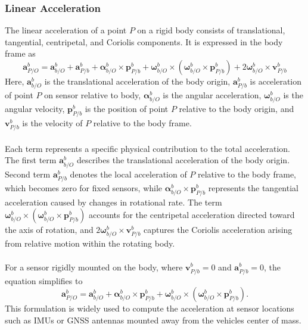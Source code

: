 \subsubsection{Linear Acceleration}
The linear acceleration of a point $P$ on a rigid body consists of translational, tangential, centripetal, and Coriolis components. It is expressed in the body frame as
$$
    \mathbf{a}_{P/O}^{b} =
    \mathbf{a}_{b/O}^{b}
    + \mathbf{a}_{P/b}^{b}
    + \boldsymbol{\alpha}_{b/O}^{b} \times \mathbf{p}_{P/b}^{b}
    + \boldsymbol{\omega}_{b/O}^{b} \times (\boldsymbol{\omega}_{b/O}^{b} \times \mathbf{p}_{P/b}^{b})
    + 2\boldsymbol{\omega}_{b/O}^{b} \times \mathbf{v}_{P/b}^{b}
$$
Here, $\mathbf{a}_{b/O}^{b}$ is the translational acceleration of the body origin, $\mathbf{a}_{P/b}^{b}$ is acceleration of point $P$ on sensor relative to body, $\boldsymbol{\alpha}_{b/O}^{b}$ is the angular acceleration, $\boldsymbol{\omega}_{b/O}^{b}$ is the angular velocity, $\mathbf{p}_{P/b}^{b}$ is the position of point $P$ relative to the body origin, and $\mathbf{v}_{P/b}^{b}$ is the velocity of $P$ relative to the body frame.  
\\ \\
Each term represents a specific physical contribution to the total acceleration. The first term $\mathbf{a}_{b/O}^{b}$ describes the translational acceleration of the body origin. Second term $\mathbf{a}_{P/b}^{b}$ denotes the local acceleration of $P$ relative to the body frame, which becomes zero for fixed sensors, while $\boldsymbol{\alpha}_{b/O}^{b} \times \mathbf{p}_{P/b}^{b}$ represents the tangential acceleration caused by changes in rotational rate. The term $\boldsymbol{\omega}_{b/O}^{b} \times (\boldsymbol{\omega}_{b/O}^{b} \times \mathbf{p}_{P/b}^{b})$ accounts for the centripetal acceleration directed toward the axis of rotation, and $2\boldsymbol{\omega}_{b/O}^{b} \times \mathbf{v}_{P/b}^{b}$ captures the Coriolis acceleration arising from relative motion within the rotating body.
\\ \\
For a sensor rigidly mounted on the body, where $\mathbf{v}_{P/b}^{b} = 0$ and $\mathbf{a}_{P/b}^{b} = 0$, the equation simplifies to  
$$
    \mathbf{a}_{P/O}^{b} =
    \mathbf{a}_{b/O}^{b}
    + \boldsymbol{\alpha}_{b/O}^{b} \times \mathbf{p}_{P/b}^{b}
    + \boldsymbol{\omega}_{b/O}^{b} \times (\boldsymbol{\omega}_{b/O}^{b} \times \mathbf{p}_{P/b}^{b}).
$$
This formulation is widely used to compute the acceleration at sensor locations such as IMUs or GNSS antennas mounted away from the vehicles center of mass.  
